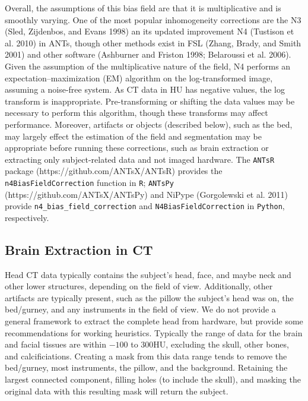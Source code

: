 \documentclass[]{elsarticle} %
\begin{document}
Overall, the assumptions of this bias field are that it is multiplicative and is smoothly varying. One of the most popular inhomogeneity corrections are the N3 (Sled, Zijdenbos, and Evans 1998) an its updated improvement N4 (Tustison et al. 2010) in ANTs, though other methods exist in FSL (Zhang, Brady, and Smith 2001) and other software (Ashburner and Friston 1998; Belaroussi et al. 2006). Given the assumption of the multiplicative nature of the field, N4 performs an expectation--maximization (EM) algorithm on the log-transformed image, assuming a noise-free system. As CT data in HU has negative values, the log transform is inappropriate. Pre-transforming or shifting the data values may be necessary to perform this algorithm, though these transforms may affect performance. Moreover, artifacts or objects (described below), such as the bed, may largely effect the estimation of the field and segmentation may be appropriate before running these corrections, such as brain extraction or extracting only subject-related data and not imaged hardware. The \texttt{ANTsR} package (https://github.com/ANTsX/ANTsR) provides the \texttt{n4BiasFieldCorrection} function in \texttt{R}; \texttt{ANTsPy} (https://github.com/ANTsX/ANTsPy) and NiPype (Gorgolewski et al. 2011) provide \texttt{n4\_bias\_field\_correction} and \texttt{N4BiasFieldCorrection} in \texttt{Python}, respectively.

\hypertarget{brain-extraction-in-ct}{%
\subsection{Brain Extraction in CT}\label{brain-extraction-in-ct}}

Head CT data typically contains the subject's head, face, and maybe neck and other lower structures, depending on the field of view. Additionally, other artifacts are typically present, such as the pillow the subject's head was on, the bed/gurney, and any instruments in the field of view. We do not provide a general framework to extract the complete head from hardware, but provide some recommendations for working heuristics. Typically the range of data for the brain and facial tissues are within \(-100\) to \(300\)HU, excluding the skull, other bones, and calcificiations. Creating a mask from this data range tends to remove the bed/gurney, most instruments, the pillow, and the background. Retaining the largest connected component, filling holes (to include the skull), and masking the original data with this resulting mask will return the subject.
\end{document}
